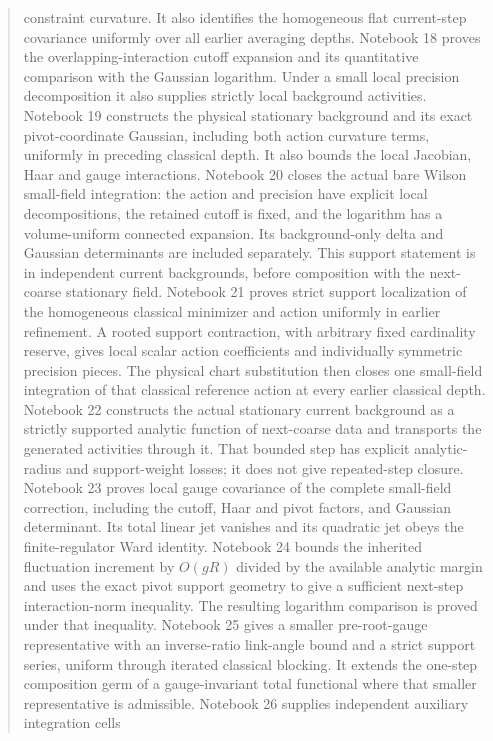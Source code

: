 \documentclass[11pt]{article}
\theoremstyle{remark}
\begin{document}
\begin{abstract}
constraint curvature. It also identifies the homogeneous flat
current-step covariance uniformly over all earlier averaging depths.
Notebook 18 proves the overlapping-interaction cutoff expansion and
its quantitative comparison with the Gaussian logarithm. Under a
small local precision decomposition it also supplies strictly local
background activities. Notebook 19 constructs the physical stationary
background and its exact pivot-coordinate Gaussian, including both
action curvature terms, uniformly in preceding classical depth.
It also bounds the local Jacobian, Haar and gauge interactions.
Notebook 20 closes the actual bare Wilson small-field integration:
the action and precision have explicit local decompositions, the
retained cutoff is fixed, and the logarithm has a volume-uniform
connected expansion. Its background-only delta and Gaussian
determinants are included separately. This support statement is
in independent current backgrounds, before composition with the
next-coarse stationary field. Notebook 21 proves strict support
localization of the homogeneous classical minimizer and action
uniformly in earlier refinement. A rooted support contraction,
with arbitrary fixed cardinality reserve, gives local scalar
action coefficients and individually symmetric precision pieces.
The physical chart substitution then closes one small-field
integration of that classical reference action at every earlier
classical depth. Notebook 22 constructs the actual stationary
current background as a strictly supported analytic function
of next-coarse data and transports the generated activities
through it. That bounded step has explicit analytic-radius
and support-weight losses; it does not give repeated-step
closure. Notebook 23 proves local gauge covariance of the
complete small-field correction, including the cutoff,
Haar and pivot factors, and Gaussian determinant. Its total
linear jet vanishes and its quadratic jet obeys the finite-regulator
Ward identity. Notebook 24 bounds the inherited fluctuation
increment by $O(gR)$ divided by the available analytic margin
and uses the
exact pivot support geometry to give a sufficient next-step
interaction-norm inequality. The resulting logarithm comparison
is proved under that inequality. Notebook 25 gives a smaller
pre-root-gauge representative with an inverse-ratio link-angle
bound and a strict support series, uniform through iterated
classical blocking. It extends the one-step composition germ of
a gauge-invariant total functional where that smaller representative
is admissible.
Notebook 26 supplies independent auxiliary integration cells

\end{abstract}
\end{document}
